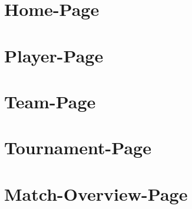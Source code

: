 \section{Home-Page}
\section{Player-Page}
\section{Team-Page}
\section{Tournament-Page}
\section{Match-Overview-Page}